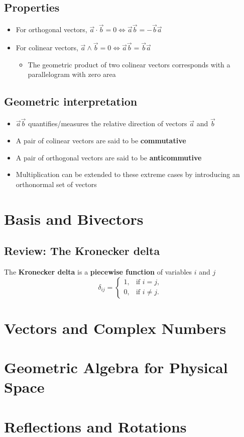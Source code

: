 \documentclass[a4paper]{article}
\begin{document}
\subsection*{Properties}
    \begin{itemize}
        \item For orthogonal vectors, $\vec{a}\cdot\vec{b}=0 \Leftrightarrow \vec{a}\vec{b}=-\vec{b}\vec{a}$
        \item For colinear vectors, $\vec{a}\wedge\vec{b}=0 \Leftrightarrow \vec{a}\vec{b}=\vec{b}\vec{a}$
            \begin{itemize}
                \item The geometric product of two colinear vectors corresponds with a parallelogram with zero area
            \end{itemize}
    \end{itemize}
\subsection*{Geometric interpretation}
    \begin{itemize}
        \item $\vec{a}\vec{b}$ quantifies/measures the relative direction of vectors $\vec{a}$ and $\vec{b}$
        \item A pair of colinear vectors are said to be \textbf{commutative}
        \item A pair of orthogonal vectors are said to be \textbf{anticommutive}
        \item Multiplication can be extended to these extreme cases by introducing an orthonormal set of vectors 
    \end{itemize}

\section*{Basis and Bivectors}
\subsection*{Review: The Kronecker delta}
The \textbf{Kronecker delta} is a \textbf{piecewise function} of variables $i$ and $j$
    \begin{equation*}
        \delta_{ij}=
            \begin{cases}
                1, &         \text{if } i=j,\\
                0, &         \text{if } i\neq j.
            \end{cases}
    \end{equation*}

\section*{Vectors and Complex Numbers}
\section*{Geometric Algebra for Physical Space}
\section*{Reflections and Rotations}
\end{document}
